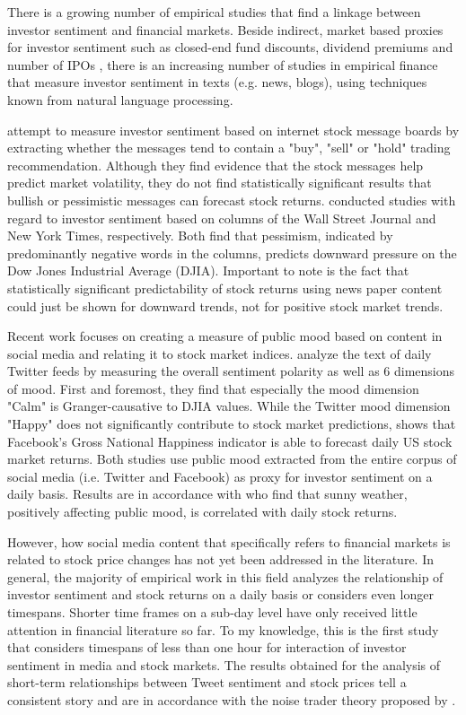 \documentclass[a4paper,12pt]{article}%
\begin{document}
There is a growing number of empirical studies that find a linkage between investor sentiment and financial markets. Beside indirect, market based proxies for investor sentiment such as closed-end fund discounts, dividend premiums and number of IPOs \citep{Lee1991, Baker2006}, there is an increasing number of studies in empirical finance that measure investor sentiment in texts (e.g. news, blogs), using techniques known from natural language processing. 

\citet{Antweiler2004} attempt to measure investor sentiment based on internet stock message boards by extracting whether the messages tend to contain a "buy", "sell" or "hold" trading recommendation. Although they find evidence that the stock messages help predict market volatility, they do not find statistically significant results that bullish or pessimistic messages can forecast stock returns.
\citet{Tetlock2007, Garcia2012} conducted studies with regard to investor sentiment based on columns of the Wall Street Journal and New York Times, respectively. Both find that pessimism, indicated by predominantly negative words in the columns, predicts downward pressure on the Dow Jones Industrial Average (DJIA). Important to note is the fact that statistically significant predictability of stock returns using news paper content could just be shown for downward trends, not for positive stock market trends.

Recent work focuses on creating a measure of public mood based on content in social media and relating it to stock market indices. \citet{Bollen2011} analyze the text of daily Twitter feeds by measuring the overall sentiment polarity as well as 6 dimensions of mood. First and foremost, they find that especially the mood dimension "Calm" is Granger-causative to DJIA values. While the Twitter mood dimension "Happy" does not significantly contribute to stock market predictions, \citet{Karabulut2013} shows that Facebook's Gross National Happiness indicator is able to forecast daily US stock market returns. Both studies use public mood extracted from the entire corpus of social media (i.e. Twitter and Facebook) as proxy for investor sentiment on a daily basis. Results are in accordance with \citet{Hirshleifer2001} who find that sunny weather, positively affecting public mood, is correlated with daily stock returns. 

However, how social media content that specifically refers to financial markets is related to stock price changes has not yet been addressed in the literature. In general, the majority of empirical work in this field analyzes the relationship of investor sentiment and stock returns on a daily basis or considers even longer timespans. Shorter time frames on a sub-day level have only received little attention in financial literature so far. To my knowledge, this is the first study that considers timespans of less than one hour for interaction of investor sentiment in media and stock markets. The results obtained for the analysis of short-term relationships between Tweet sentiment and stock prices tell a consistent story and are in accordance with the noise trader theory proposed by \citet{DeLong1990}.
\end{document}
